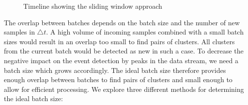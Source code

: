 \begin{figure}[h]
    \centering


    \caption{Timeline showing the sliding window approach}
    \label{fig:timeline}
\end{figure}

The overlap between batches depends on the batch size and the number of new samples in $\triangle t$.
A high volume of incoming samples combined with a small batch sizes
would result in an overlap too small to find pairs of clusters.
All clusters from the current batch would be detected as new in such a case.
To decrease the negative impact on the event detection by peaks in the data stream,
we need a batch size which grows accordingly.
The ideal batch size therefore provides enough overlap between batches to find pairs of clusters
and small enough to allow for efficient processing.
We explore three different methods for determining the ideal batch size:

